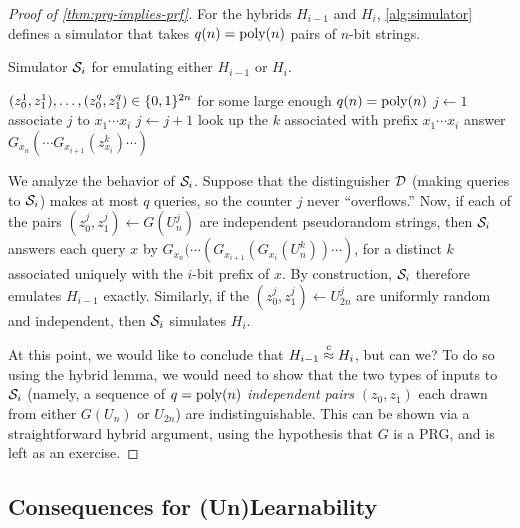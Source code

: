 \documentclass[11pt]{article}
\begin{document}
\begin{proof}[Proof of \cref{thm:prg-implies-prf}]
  For the hybrids $H_{i-1}$ and $H_{i}$, \cref{alg:simulator}
  defines a simulator that takes $q(n) = \operatorname{poly}(n)$ pairs of $n$-bit
  strings.
  
  \renewcommand{\algorithmicrequire}{\textbf{Input:}}

  \begin{algorithm}
    \caption{Simulator $\mathcal{S}_{i}$ for emulating either $H_{i-1}$ or $H_{i}$.}
    \label{alg:simulator}
    \begin{algorithmic}[1]
      \REQUIRE $(z^1_0, z^1_1), \ldots , (z^q_0, z^q_1) \in \{0,1\}^{2n}$
      for some large enough $q(n) = \operatorname{poly}(n)$
      \STATE $j \gets 1$
      \STATE associate $j$ to $x_{1} \cdots x_{i}$
      \STATE $j \gets j+1$
      \ENDIF
      \STATE look up the $k$ associated with prefix $x_{1} \cdots
      x_{i}$
      \STATE answer $G_{x_{n}}(\cdots G_{x_{i+1}}(z^{k}_{x_{i}})
      \cdots)$
      \ENDWHILE
    \end{algorithmic}
  \end{algorithm}

  We analyze the behavior of $\mathcal{S}_{i}$.  Suppose that the
  distinguisher $\mathcal{D}$ (making queries to $\mathcal{S}_{i}$) makes at most
  $q$ queries, so the counter $j$ never ``overflows.''  Now, if each
  of the pairs $(z^{j}_{0}, z^{j}_{1}) \gets G(U^{j}_{n})$ are
  independent pseudorandom strings, then $\mathcal{S}_{i}$ answers each query
  $x$ by $G_{x_{n}}(\cdots (G_{x_{i+1}}(G_{x_{i}}(U^{k}_{n}))\cdots)$,
  for a distinct $k$ associated uniquely with the $i$-bit prefix of
  $x$.  By construction, $\mathcal{S}_{i}$ therefore emulates $H_{i-1}$
  exactly.  Similarly, if the $(z^{j}_{0}, z^{j}_{1}) \gets U^j_{2n}$
  are uniformly random and independent, then $\mathcal{S}_{i}$ simulates
  $H_{i}$.

  At this point, we would like to conclude that $H_{i-1} \stackrel{c}{\approx}
  H_{i}$, but can we?  To do so using the hybrid lemma, we would need
  to show that the two types of inputs to $\mathcal{S}_{i}$ (namely, a
  sequence of $q = \operatorname{poly}(n)$ \emph{independent pairs} $(z_{0}, z_{1})$
  each drawn from either $G(U_{n})$ or $U_{2n}$) are
  indistinguishable.  This can be shown via a straightforward hybrid
  argument, using the hypothesis that $G$ is a PRG, and is left as an
  exercise.
\end{proof}

\subsection{Consequences for (Un)Learnability}
\label{sec:cons-learning}
\end{document}
